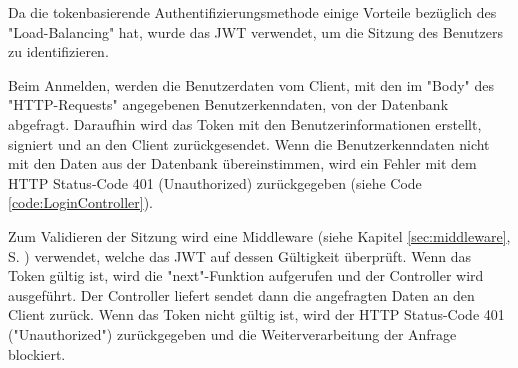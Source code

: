 
Da die tokenbasierende Authentifizierungsmethode einige Vorteile bezüglich des "Load-Balancing" hat, wurde das JWT verwendet, um die Sitzung des Benutzers zu identifizieren.



Beim Anmelden, werden die Benutzerdaten vom Client, mit den im "Body" des "HTTP-Requests" angegebenen Benutzerkenndaten, von der Datenbank abgefragt. 
Daraufhin wird das Token mit den Benutzerinformationen erstellt, signiert und an den Client zurückgesendet. 
Wenn die Benutzerkenndaten nicht mit den Daten aus der Datenbank übereinstimmen, wird ein Fehler mit dem HTTP Status-Code 401 (Unauthorized) zurückgegeben (siehe Code \ref{code:LoginController}).


\pagebreak
{}

Zum Validieren der Sitzung wird eine Middleware (siehe Kapitel \ref{sec:middleware}, S. \pageref{sec:middleware}) verwendet, welche das JWT auf dessen Gültigkeit überprüft. 
Wenn das Token gültig ist, wird die "next"-Funktion aufgerufen und der Controller wird ausgeführt. Der Controller liefert sendet dann die angefragten Daten an den Client zurück. 
Wenn das Token nicht gültig ist, wird der HTTP Status-Code 401 ("Unauthorized") zurückgegeben und die Weiterverarbeitung der Anfrage blockiert.

